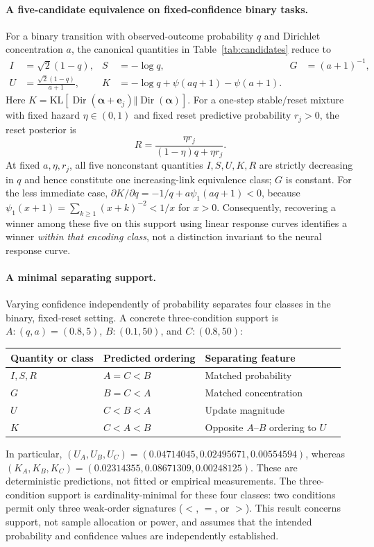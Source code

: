 \paragraph{A five-candidate equivalence on fixed-confidence binary tasks.}
For a binary transition with observed-outcome probability $q$ and Dirichlet
concentration $a$, the canonical quantities in Table~\ref{tab:candidates} reduce to
\begin{align}
I&=\sqrt{2}(1-q), & S&=-\log q, & G&=(a+1)^{-1},\nonumber\\
U&=\frac{\sqrt{2}(1-q)}{a+1}, &
K&=-\log q+\psi(aq+1)-\psi(a+1).
\label{eq:canonical_binary_candidates}
\end{align}
Here $K=\mathrm{KL}[\operatorname{Dir}(\boldsymbol\alpha+\mathbf e_j)
\Vert\operatorname{Dir}(\boldsymbol\alpha)]$. For a one-step stable/reset
mixture with fixed hazard $\eta\in(0,1)$ and fixed reset predictive probability
$r_j>0$, the reset posterior is
\begin{equation}
R=\frac{\eta r_j}{(1-\eta)q+\eta r_j}.
\label{eq:restricted_reset_posterior}
\end{equation}
At fixed $a,\eta,r_j$, all five nonconstant quantities $I,S,U,K,R$ are strictly
decreasing in $q$ and hence constitute one increasing-link equivalence class;
$G$ is constant. For the less immediate case,
$\partial K/\partial q=-1/q+a\psi_1(aq+1)<0$, because
$\psi_1(x+1)=\sum_{k\geq1}(x+k)^{-2}<1/x$ for $x>0$.
Consequently, recovering a winner among these five on this support using linear
response curves identifies a winner \emph{within that encoding class}, not a
distinction invariant to the neural response curve.

\paragraph{A minimal separating support.}
Varying confidence independently of probability separates four classes in the
binary, fixed-reset setting. A concrete three-condition support is
$A:(q,a)=(0.8,5)$, $B:(0.1,50)$, and $C:(0.8,50)$:
\begin{center}
\begin{tabular}{llll}
\toprule
Quantity or class & Predicted ordering & Separating feature\\
\midrule
$I,S,R$ & $A=C<B$ & Matched probability\\
$G$ & $B=C<A$ & Matched concentration\\
$U$ & $C<B<A$ & Update magnitude\\
$K$ & $C<A<B$ & Opposite $A$--$B$ ordering to $U$\\
\bottomrule
\end{tabular}
\end{center}
In particular, $(U_A,U_B,U_C)=(0.04714045,0.02495671,0.00554594)$,
whereas $(K_A,K_B,K_C)=(0.02314355,0.08671309,0.00248125)$.
These are deterministic predictions, not fitted or empirical measurements.
The three-condition support is cardinality-minimal for these four classes:
two conditions permit only three weak-order signatures ($<$, $=$, or $>$).
This result concerns support, not sample allocation or power, and assumes that
the intended probability and confidence values are independently established.

